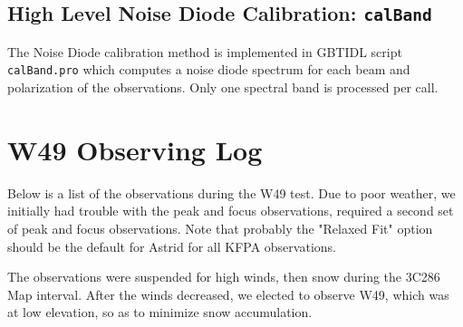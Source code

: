 \documentclass[12pt,twoside]{article}
\begin{document}
\subsection{High Level Noise Diode Calibration: \tt calBand}

The Noise Diode calibration method is implemented in GBTIDL script
{\tt calBand.pro} which computes a noise diode spectrum for each beam and polarization
of the observations.   Only one spectral band is processed per call.   

\clearpage
\section{W49 Observing Log}

Below is a list of the observations during the W49 test.  Due to poor weather, we initially had trouble with 
the peak and focus observations, required a second set of peak and focus observations.
Note that probably the "Relaxed Fit" option should be the default for Astrid for
all KFPA observations.

The observations were suspended for high winds, then snow during the 3C286 Map 
interval.  After the winds decreased, we elected to observe W49, 
which was at low elevation, so as to minimize snow accumulation.
  
\end{document}
